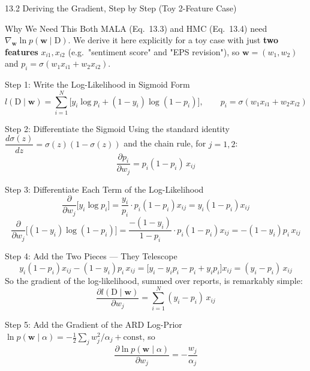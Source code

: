 \documentclass[aspectratio=169,10pt]{beamer}
\newcommand{\w}{\mathbf{w}}
\newcommand{\Data}{\mathrm{D}}
\newcommand{\sig}{\sigma}
\begin{document}
\begin{frame}[allowframebreaks]{13.2 \; Deriving the Gradient, Step by Step (Toy 2-Feature Case)}

\begin{alertblock}{Why We Need This}
Both MALA (Eq.~13.3) and HMC (Eq.~13.4) need $\nabla_\w \ln p(\w\mid\Data)$.
We derive it here explicitly for a toy case with just \textbf{two features}
$x_{i1},x_{i2}$ (e.g.\ "sentiment score" and "EPS revision"), so $\w=(w_1,w_2)$
and $p_i=\sig(w_1 x_{i1}+w_2 x_{i2})$.
\end{alertblock}

\begin{block}{Step 1: Write the Log-Likelihood in Sigmoid Form}
\[
  l(\Data\mid\w) = \sum_{i=1}^N \Big[y_i\log p_i + (1-y_i)\log(1-p_i)\Big], \qquad p_i=\sig(w_1x_{i1}+w_2x_{i2})
\]
\end{block}

\begin{block}{Step 2: Differentiate the Sigmoid}
Using the standard identity $\dfrac{d\sig(z)}{dz}=\sig(z)(1-\sig(z))$ and the
chain rule, for $j=1,2$:
\[
  \frac{\partial p_i}{\partial w_j} = p_i(1-p_i)\,x_{ij}
\]
\end{block}

\framebreak

\begin{block}{Step 3: Differentiate Each Term of the Log-Likelihood}
\[
  \frac{\partial}{\partial w_j}\big[y_i\log p_i\big]
  = \frac{y_i}{p_i}\cdot p_i(1-p_i)x_{ij} = y_i(1-p_i)x_{ij}
\]
\[
  \frac{\partial}{\partial w_j}\big[(1-y_i)\log(1-p_i)\big]
  = \frac{-(1-y_i)}{1-p_i}\cdot p_i(1-p_i)x_{ij} = -(1-y_i)p_i\,x_{ij}
\]
\end{block}

\begin{block}{Step 4: Add the Two Pieces --- They Telescope}
\[
  y_i(1-p_i)x_{ij} - (1-y_i)p_i\,x_{ij}
  = \big[y_i - y_ip_i - p_i + y_ip_i\big]x_{ij} = (y_i-p_i)\,x_{ij}
\]
So the gradient of the log-likelihood, summed over reports, is remarkably
simple:
\[
  \boxed{\frac{\partial l(\Data\mid\w)}{\partial w_j} = \sum_{i=1}^N (y_i-p_i)\,x_{ij}}
\]
\end{block}

\framebreak

\begin{block}{Step 5: Add the Gradient of the ARD Log-Prior}
$\ln p(\w\mid\alpha) = -\tfrac12\sum_j w_j^2/\alpha_j + \text{const}$, so
\[
  \frac{\partial \ln p(\w\mid\alpha)}{\partial w_j} = -\frac{w_j}{\alpha_j}
\]
\end{block}


\end{frame}
\end{document}
